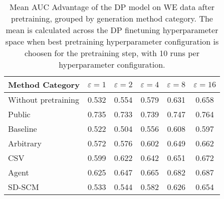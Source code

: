 \begin{table}[h!]
    \centering
    \caption{Mean AUC Advantage of the DP model on WE data after pretraining, grouped by generation method category. The mean is calculated across the DP finetuning hyperparameter space when best pretraining hyperparameter configuration is choosen for the pretraining step, with 10 runs per hyperparameter configuration.}
    \label{tab:epsilon_comparison}
    \begin{tabular}{lccccc}
    \toprule
    Method Category & $\varepsilon=1$ & $\varepsilon=2$ & $\varepsilon=4$ & $\varepsilon=8$ & $\varepsilon=16$ \\
    \midrule
    Without pretraining & 0.532 & 0.554 & 0.579 & 0.631 & 0.658 \\
    \arrayrulecolor{black!50!}\midrule
    Public & \cellcolor{gold!30}0.735 & \cellcolor{gold!30}0.733 & \cellcolor{gold!30}0.739 & \cellcolor{gold!30}0.747 & \cellcolor{gold!30}0.764 \\
    \arrayrulecolor{black!50!}\midrule
    Baseline & 0.522 & 0.504 & 0.556 & 0.608 & 0.597 \\
    \arrayrulecolor{black!50!}\midrule
    Arbitrary & 0.572 & 0.576 & 0.602 & 0.649 & 0.662 \\
    \arrayrulecolor{black!50!}\midrule
    CSV & \cellcolor{bronze!30}0.599 & \cellcolor{bronze!30}0.622 & \cellcolor{bronze!30}0.642 & \cellcolor{bronze!30}0.651 & \cellcolor{bronze!30}0.672 \\
    Agent & \cellcolor{silver!30}0.625 & \cellcolor{silver!30}0.647 & \cellcolor{silver!30}0.665 & \cellcolor{silver!30}0.682 & \cellcolor{silver!30}0.687 \\
    SD-SCM & 0.533 & 0.544 & 0.582 & 0.626 & 0.654 \\
    \bottomrule
    \end{tabular}
\end{table}